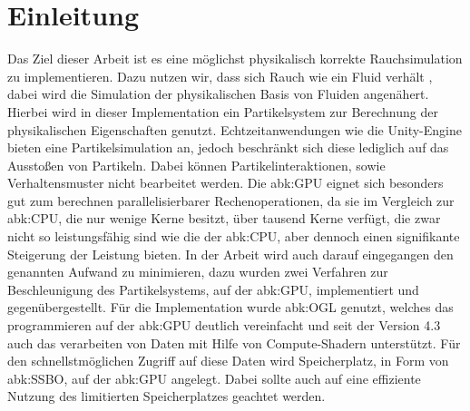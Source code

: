 \documentclass[intern,palatino]{cgBA}
\begin{document}

\section{Einleitung}

Das Ziel dieser Arbeit ist es eine möglichst physikalisch korrekte Rauchsimulation zu implementieren. Dazu nutzen wir, dass sich Rauch wie ein Fluid verhält \cite{stam2003real}, dabei wird die Simulation der physikalischen Basis von Fluiden angenähert. Hierbei wird in dieser Implementation ein Partikelsystem zur Berechnung der physikalischen Eigenschaften genutzt. Echtzeitanwendungen wie die Unity-Engine bieten eine Partikelsimulation an, jedoch beschränkt sich diese lediglich auf das Ausstoßen von Partikeln. Dabei können Partikelinteraktionen, sowie Verhaltensmuster nicht bearbeitet werden.
\newline \newline
Die \acl{abk:GPU} eignet sich besonders gut zum berechnen parallelisierbarer Rechenoperationen, da sie im Vergleich zur \ac{abk:CPU}, die nur wenige Kerne besitzt, über tausend Kerne verfügt, die zwar nicht so leistungsfähig sind wie die der \ac{abk:CPU}, aber dennoch einen signifikante Steigerung der Leistung bieten.
\newline \newline
In der Arbeit wird auch darauf eingegangen den genannten Aufwand zu minimieren, dazu wurden zwei Verfahren zur Beschleunigung des Partikelsystems, auf der \ac{abk:GPU},  implementiert und gegenübergestellt.
\newline \newline
Für die Implementation wurde \ac{abk:OGL} genutzt, welches das programmieren auf der \ac{abk:GPU} deutlich vereinfacht und seit der Version 4.3 auch das verarbeiten von Daten mit Hilfe von Compute-Shadern unterstützt. Für den schnellstmöglichen Zugriff auf diese Daten wird Speicherplatz, in Form von \ac{abk:SSBO}, auf der \ac{abk:GPU} angelegt. Dabei sollte auch auf eine effiziente Nutzung des limitierten Speicherplatzes geachtet werden.

\end{document}
